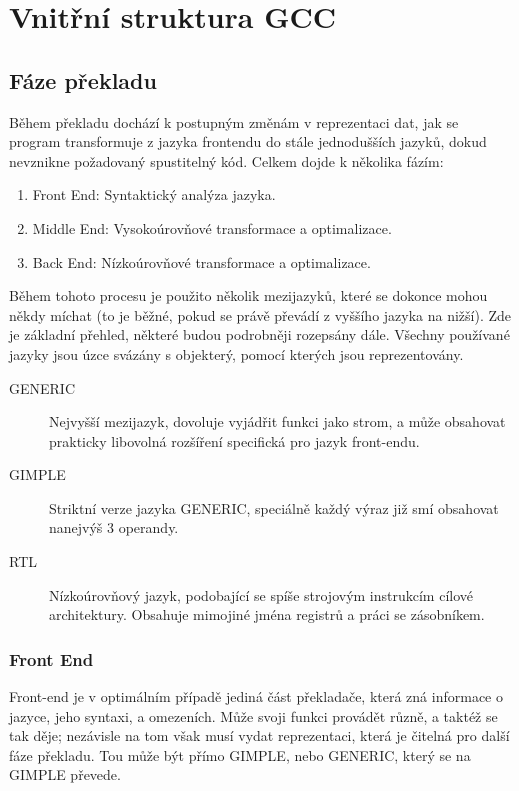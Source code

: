 \chapter{Vnitřní struktura GCC}

\section{Fáze překladu}

Během překladu dochází k postupným změnám v reprezentaci dat, jak se program
transformuje z jazyka frontendu do stále jednodušších jazyků, dokud nevznikne
požadovaný spustitelný kód. Celkem dojde k několika fázím:

\begin{enumerate}
	\item Front End: Syntaktický analýza jazyka.
	\item Middle End: Vysokoúrovňové transformace a optimalizace.
	\item Back End: Nízkoúrovňové transformace a optimalizace.
\end{enumerate}

Během tohoto procesu je použito několik mezijazyků, které se dokonce mohou někdy
míchat (to je běžné, pokud se právě převádí z vyššího jazyka na nižší). Zde je
základní přehled, některé budou podrobněji rozepsány dále. Všechny používané
jazyky jsou úzce svázány s objekterý, pomocí kterých jsou reprezentovány.

\begin{description}
	\item[GENERIC] Nejvyšší mezijazyk, dovoluje vyjádřit funkci jako strom, a
		může obsahovat prakticky libovolná rozšíření specifická pro jazyk
		front-endu.
	\item[GIMPLE] Striktní verze jazyka GENERIC, speciálně každý výraz již smí
		obsahovat nanejvýš 3 operandy.
	\item[RTL] Nízkoúrovňový jazyk, podobající se spíše strojovým instrukcím
		cílové architektury. Obsahuje mimojiné jména registrů a práci se
		zásobníkem.
\end{description}

\subsection{Front End}

Front-end je v optimálním případě jediná část překladače, která zná informace o
jazyce, jeho syntaxi, a omezeních. Může svoji funkci provádět různě, a taktéž se
tak děje; nezávisle na tom však musí vydat reprezentaci, která je čitelná pro
další fáze překladu. Tou může být přímo GIMPLE, nebo GENERIC, který se na GIMPLE
převede.

